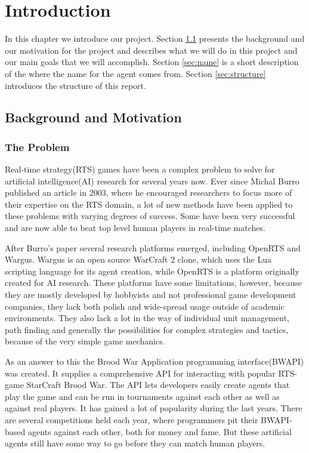 
\chapter{Introduction}
In this chapter we introduce our project. Section \ref{sec:background} presents the background and our motivation for the project and describes what we will do in this project and our main goals that we will accomplish. Section \ref{sec:name} is a short description of the where the name for the agent comes from. Section \ref{sec:structure} introduces the structure of this report.

\section{Background and Motivation}
\label{sec:background}

\subsection{The Problem}
Real-time strategy(RTS) games have been a complex problem to solve for artificial intelligence(AI) research for several years now. Ever since Michal Burro published an article in 2003\cite{buro2003real}, where he encouraged researchers to focus more of their expertise on the RTS domain, a lot of new methods have been applied to these problems with varying degrees of success. Some have been very successful and are now able to beat top level human players in real-time matches.\cite{campbell2002deep} 

After Burro's paper several research platforms emerged, including OpenRTS\cite{buro2003orts} and Wargus\cite{wargus}. Wargus is an open source WarCraft 2 clone, which uses the Lua scripting language for its agent creation, while OpenRTS is a platform originally created for AI research. These platforms have some limitations, however, because they are mostly developed by hobbyists and not professional game development companies, they lack both polish and wide-spread usage outside of academic environments. They also lack a lot in the way of individual unit management, path finding and generally the possibilities for complex strategies and tactics, because of the very simple game mechanics. 

As an answer to this the Brood War Application programming interface(BWAPI) was created. It supplies a comprehensive API for interacting with popular RTS-game StarCraft Brood War. The API lets developers easily create agents that play the game and can be run in tournaments against each other as well as against real players. It has gained a lot of popularity during the last years.\cite{bwapi} There are several competitions held each year, where programmers pit their BWAPI-based agents against each other, both for money and fame.\cite{sscait} But these artificial agents still have some way to go before they can match human players.\cite{eisbotvsfong}

